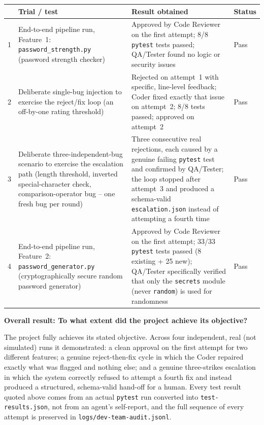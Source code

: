 \documentclass[11pt,a4paper]{article}
\newcommand{\answerarea}[2]{\textbf{#1}\par\begin{answerbox}#2\end{answerbox}}
\begin{document}
\begin{tabularx}{\linewidth}{@{}C{0.7cm}Y Y L{2.1cm}@{}}
\toprule
& \textbf{Trial / test} & \textbf{Result obtained} & \textbf{Status} \\
 & End-to-end pipeline run, Feature~1: \texttt{password\_strength.py} (password strength checker) & Approved by Code Reviewer on the first attempt; 8/8 \texttt{pytest} tests passed; QA/Tester found no logic or security issues & Pass \\
2 & Deliberate single-bug injection to exercise the reject/fix loop (an off-by-one rating threshold) & Rejected on attempt~1 with specific, line-level feedback; Coder fixed exactly that issue on attempt~2; 8/8 tests passed; approved on attempt~2 & Pass \\
3 & Deliberate three-independent-bug scenario to exercise the escalation path (length threshold, inverted special-character check, comparison-operator bug -- one fresh bug per round) & Three consecutive real rejections, each caused by a genuine failing \texttt{pytest} test and confirmed by QA/Tester; the loop stopped after attempt~3 and produced a schema-valid \texttt{escalation.json} instead of attempting a fourth time & Pass \\
4 & End-to-end pipeline run, Feature~2: \texttt{password\_generator.py} (cryptographically secure random password generator) & Approved by Code Reviewer on the first attempt; 33/33 \texttt{pytest} tests passed (8 existing + 25 new); QA/Tester specifically verified that only the \texttt{secrets} module (never \texttt{random}) is used for randomness & Pass \\
\bottomrule
\end{tabularx}

\answerarea{Overall result: To what extent did the project achieve its objective?}{
The project fully achieves its stated objective. Across four independent, real (not
simulated) runs it demonstrated: a clean approval on the first attempt for two different
features; a genuine reject-then-fix cycle in which the Coder repaired exactly what was
flagged and nothing else; and a genuine three-strikes escalation in which the system
correctly refused to attempt a fourth fix and instead produced a structured, schema-valid
hand-off for a human. Every test result quoted above comes from an actual \texttt{pytest}
run converted into \texttt{test-results.json}, not from an agent's self-report, and the full
sequence of every attempt is preserved in \texttt{logs/dev-team-audit.jsonl}.
}
\end{document}
